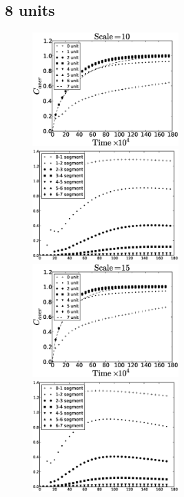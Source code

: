 \documentclass{article}
\begin{document}
\subsection{8 units} 
\begin{figure}[htb!]
\includegraphics[width=0.5\textwidth]{Figures/aver_units8scale10.eps}\hfill
\includegraphics[width=0.5\textwidth]{Figures/coeff_units8scale10.eps}\\
\includegraphics[width=0.5\textwidth]{Figures/aver_units8scale15.eps}\hfill
\includegraphics[width=0.5\textwidth]{Figures/coeff_units8scale15.eps}\\

\end{figure}
\end{document}
